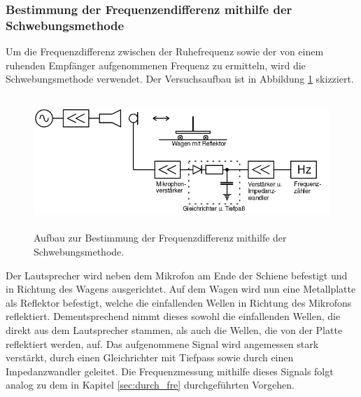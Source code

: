 \subsubsection{Bestimmung der Frequenzendifferenz mithilfe der Schwebungsmethode}
\label{sec:d3}
Um die Frequenzdifferenz zwischen der Ruhefrequenz sowie der von einem ruhenden Empfänger aufgenommenen Frequenz zu ermitteln, wird die Schwebungsmethode verwendet.
Der Versuchsaufbau ist in Abbildung \ref{tfig:3} skizziert.
\begin{figure}
  \centering
  \includegraphics[height=5cm]{aufbau3.png}
  \caption{Aufbau zur Bestimmung der Frequenzdifferenz mithilfe der Schwebungsmethode. \cite{sample}}
  \label{tfig:3}
\end{figure}
Der Lautsprecher wird neben dem Mikrofon am Ende der Schiene befestigt und in Richtung des Wagens ausgerichtet. Auf dem Wagen wird nun eine Metallplatte als Reflektor befestigt, welche die einfallenden Wellen in Richtung des Mikrofons reflektiert.
Dementsprechend nimmt dieses sowohl die einfallenden Wellen, die direkt aus dem Lautsprecher stammen, als auch die Wellen, die von der Platte reflektiert werden, auf.
Das aufgenommene Signal wird angemessen stark verstärkt, durch einen Gleichrichter mit Tiefpass sowie durch einen Impedanzwandler geleitet.
Die Frequenzmessung mithilfe dieses Signals folgt analog zu dem in Kapitel \ref{sec:durch_fre} durchgeführten Vorgehen.

